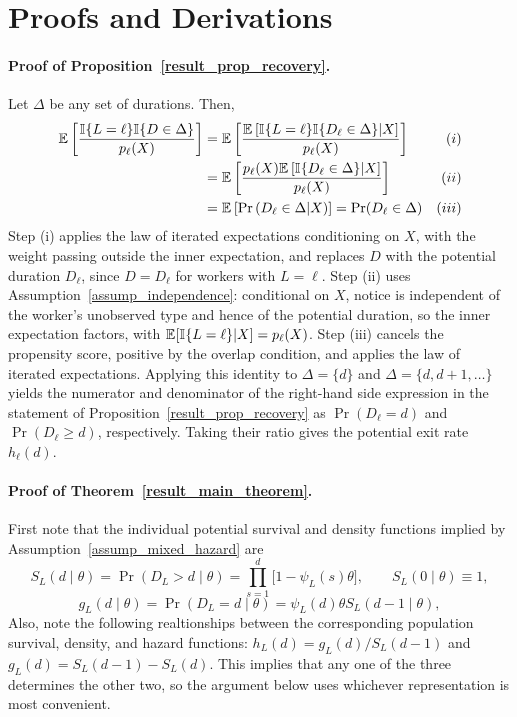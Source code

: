 \documentclass{div}
\begin{document}

\clearpage
\section{Proofs and Derivations}\label{app_proofs}


\paragraph{Proof of Proposition~\ref{result_prop_recovery}.}
Let $\Delta$ be any set of durations. Then,
\begin{align*}
\E\left[\frac{\I\{L=\ell\}\I\{D \in \Delta\}}{p_\ell(X)}\right]
&= \E\left[\frac{\E\left[\I\{L=\ell\}\I\{D_\ell \in \Delta\} \middle| X\right]}{p_\ell(X)}\right] & (i) \\
&= \E\left[\frac{p_\ell(X)\E\left[\I\{D_\ell \in \Delta\} \middle| X\right]}{p_\ell(X)}\right] & (ii) \\
&= \E\left[\Pr\left(D_\ell \in \Delta \middle| X\right)\right] = \Pr(D_\ell \in \Delta) & (iii)
\end{align*}
Step (i) applies the law of iterated expectations conditioning on $X$, with the weight passing outside the inner expectation, and replaces $D$ with the potential duration $D_\ell$, since $D = D_\ell$ for workers with $L = \ell$. Step (ii) uses Assumption~\ref{assump_independence}: conditional on $X$, notice is independent of the worker's unobserved type and hence of the potential duration, so the inner expectation factors, with $\E[\I\{L=\ell\}|X] = p_\ell(X)$. Step (iii) cancels the propensity score, positive by the overlap condition, and applies the law of iterated expectations. Applying this identity to $\Delta = \{d\}$ and $\Delta = \{d,d+1,\ldots\}$ yields the numerator and denominator of the right-hand side expression in the statement of Proposition~\ref{result_prop_recovery} as $\Pr(D_\ell=d)$ and $\Pr(D_\ell\geq d)$, respectively. Taking their ratio gives the potential exit rate $h_\ell(d)$.


\paragraph{Proof of Theorem~\ref{result_main_theorem}.}
First note that the individual potential survival and density functions implied by Assumption~\ref{assump_mixed_hazard} are
\[
S_L(d \mid \theta) = \Pr(D_L > d \mid \theta) = \prod_{s=1}^{d} \big[1 - \psi_L(s)\theta\big], \qquad S_L(0 \mid \theta) \equiv 1,
\]
\[
g_L(d \mid \theta) = \Pr(D_L = d \mid \theta) = \psi_L(d)\theta S_L(d-1 \mid \theta),
\]
Also, note the following realtionships between the corresponding population survival, density, and hazard functions: $h_L(d) = g_L(d)/S_L(d-1)$ and $g_L(d) = S_L(d-1) - S_L(d)$. This implies that any one of the three  determines the other two, so the argument below uses whichever representation is most convenient.
\end{document}
